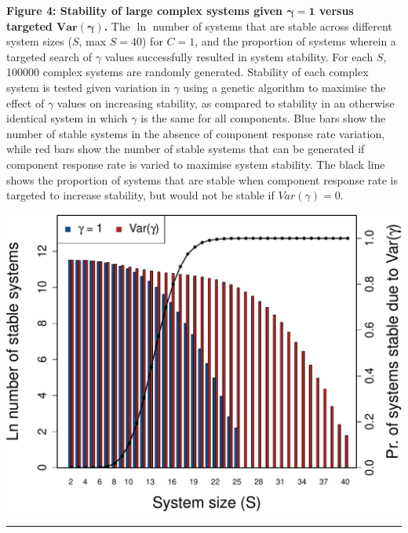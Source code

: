 \documentclass[]{article}
\begin{document}
\textbf{Figure 4: Stability of large complex systems given
\(\boldsymbol{\gamma = 1}\) versus targeted
\(\boldsymbol{Var(\gamma)}\).} The \(\ln\) number of systems that are
stable across different system sizes (\(S\), max \(S=40\)) for
\(C = 1\), and the proportion of systems wherein a targeted search of
\(\gamma\) values successfully resulted in system stability. For each
\(S\), 100000 complex systems are randomly generated. Stability of each
complex system is tested given variation in \(\gamma\) using a genetic
algorithm to maximise the effect of \(\gamma\) values on increasing
stability, as compared to stability in an otherwise identical system in
which \(\gamma\) is the same for all components. Blue bars show the
number of stable systems in the absence of component response rate
variation, while red bars show the number of stable systems that can be
generated if component response rate is varied to maximise system
stability. The black line shows the proportion of systems that are
stable when component response rate is targeted to increase stability,
but would not be stable if \(Var(\gamma) = 0\).

\includegraphics{unnamed-chunk-16-1.pdf}

\begin{center}\rule{0.5\linewidth}{\linethickness}\end{center}
\end{document}
